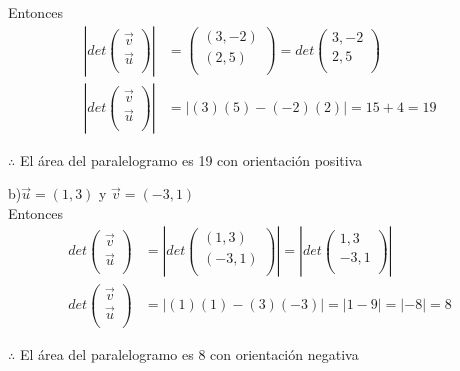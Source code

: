 \documentclass[letterpaper]{article}
\renewcommand{\*}{\cdot}
\theoremstyle{definition}
\begin{document}
	Entonces 
	\begin{align*}
		\left|det\begin{pmatrix}
		\vec{v}\\
		\vec{u}\\
		\end{pmatrix} \right|& = \begin{pmatrix}
		(3,-2)\\
		(2,5)\\
		\end{pmatrix} = det\begin{pmatrix}
		3,-2\\
		2,5\\
		\end{pmatrix}\\
		\left|det\begin{pmatrix}
		\vec{v}\\
		\vec{u}\\
		\end{pmatrix} \right|& = |(3)(5)-(-2)(2)| = 15+4 = 19
	\end{align*}
	\begin{center}
		$ \therefore $ El área del paralelogramo es 19 con orientación positiva
	\end{center}
	b)$\vec{u}  = (1,3)$ y $\vec{v}  = (-3,1)$\\
	Entonces 
	\begin{align*}
		 det\begin{pmatrix}
		 \vec{v}\\
		 \vec{u}\\
		 \end{pmatrix}  & = \left|  det\begin{pmatrix}
		 (1,3)\\
		 (-3,1)\\
		 \end{pmatrix} \right| = \left|  det\begin{pmatrix}
		 1,3\\
		 -3,1\\
		 \end{pmatrix} \right|\\
		 det\begin{pmatrix}
		 \vec{v}\\
		 \vec{u}\\
		 \end{pmatrix} & = |(1)(1)-(3)(-3)| = |1-9| = |-8| = 8
	\end{align*}
	\begin{center}
		$ \therefore $ El área del paralelogramo es 8 con orientación negativa
	\end{center}
\end{document}
